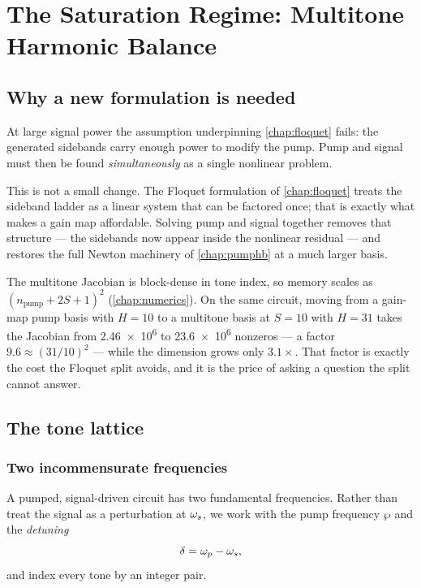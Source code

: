 \chapter{The Saturation Regime: Multitone Harmonic Balance}
\label{chap:saturation}

\section{Why a new formulation is needed}

At large signal power the assumption underpinning \cref{chap:floquet} fails: the
generated sidebands carry enough power to modify the pump. Pump and signal must
then be found \emph{simultaneously} as a single nonlinear problem.

This is not a small change. The Floquet formulation of \cref{chap:floquet}
treats the sideband ladder as a linear system that can be factored once; that is
exactly what makes a gain map affordable. Solving pump and signal together
removes that structure --- the sidebands now appear inside the nonlinear
residual --- and restores the full Newton machinery of \cref{chap:pumphb} at a
much larger basis.

\begin{remark}
The multitone Jacobian is block-dense in tone index, so memory scales as
$(n_{\mathrm{pump}} + 2S + 1)^{2}$ (\cref{chap:numerics}). On the same circuit,
moving from a gain-map pump basis with $H=10$ to a multitone basis at $S=10$
with $H=31$ takes the Jacobian from \num{2.46e6} to \num{23.6e6} nonzeros --- a
factor $9.6 \approx (31/10)^{2}$ --- while the dimension grows only $3.1\times$.
That factor is exactly the cost the Floquet split avoids, and it is the price of
asking a question the split cannot answer.
\end{remark}

\section{The tone lattice}

\subsection{Two incommensurate frequencies}

A pumped, signal-driven circuit has two fundamental frequencies. Rather than
treat the signal as a perturbation at $\omega_{s}$, we work with the pump frequency
$\wp$ and the \emph{detuning}
\begin{equation}
  \delta = \omega_{p} - \omega_{s},
\end{equation}
and index every tone by an integer pair.

